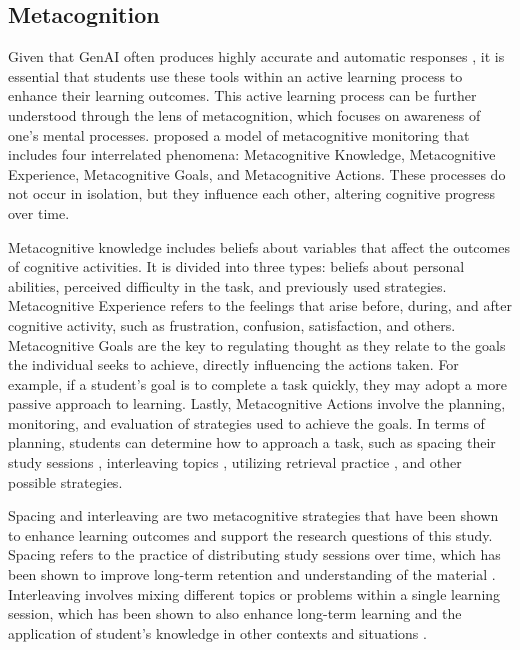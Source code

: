 \documentclass[a4paper,twoside]{article}
\begin{document}
\subsection{Metacognition}

Given that GenAI often produces highly accurate and automatic responses
\citep{Puryear22}, it is essential that students use these tools within an
active learning process to enhance their learning outcomes. This active
learning process can be further understood through the lens of metacognition,
which focuses on awareness of one's mental processes. \cite{flavell79}
proposed a model of metacognitive monitoring that includes four interrelated
phenomena: Metacognitive Knowledge, Metacognitive Experience, Metacognitive
Goals, and Metacognitive Actions. These processes do not occur in isolation, but
they influence each other, altering cognitive progress over time.

Metacognitive knowledge includes beliefs about variables that affect the
outcomes of cognitive activities. It is divided into three types: beliefs about
personal abilities, perceived difficulty in the task, and previously used
strategies. Metacognitive Experience refers to the feelings that arise before,
during, and after cognitive activity, such as frustration, confusion,
satisfaction, and others. Metacognitive Goals are the key to regulating thought
as they relate to the goals the individual seeks to achieve, directly
influencing the actions taken. For example, if a student’s goal is to complete
a task quickly, they may adopt a more passive approach to learning. Lastly,
Metacognitive Actions involve the planning, monitoring, and evaluation of
strategies used to achieve the goals. In terms of planning, students can
determine how to approach a task, such as spacing their study sessions
\citep{Ouhao18, Carvalho20}, interleaving topics \citep{Rivers21}, utilizing
retrieval practice \citep{larsen18}, and other possible strategies.

Spacing and interleaving are two metacognitive strategies that have been shown
to enhance learning outcomes and support the research questions of this study.
Spacing refers to the practice of distributing study sessions over time, which
has been shown to improve long-term retention and understanding of the material
\citep{Carvalho20}. Interleaving involves mixing different topics or problems
within a single learning session, which has been shown to also enhance long-term
learning and the application of student's knowledge in other contexts and
situations \citep{Rivers21}.
\end{document}
